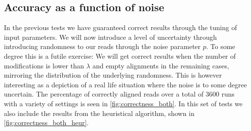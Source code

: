 \documentclass[thesis.tex]{subfiles}
\begin{document}
\subsection*{Accuracy as a function of noise}
In the previous tests we have guaranteed correct results through the tuning of input parameters. We will now introduce a level of uncertainty through introducing randomness to our reads through the noise parameter $p$. To some degree this is a futile exercise: We will get correct results when the number of modifications is lower than $\lambda$ and empty alignments in the remaining cases, mirroring the distribution of the underlying randomness. This is however interesting as a depiction of a real life situation where the noise is to some degree uncertain. The percentage of correctly aligned reads over a total of 3600 runs with a variety of settings is seen in \ref{fig:correctness_both}. In this set of tests we also include the results from the heuristical algorithm, shown in \ref{fig:correctness_both_heur}.
\end{document}
